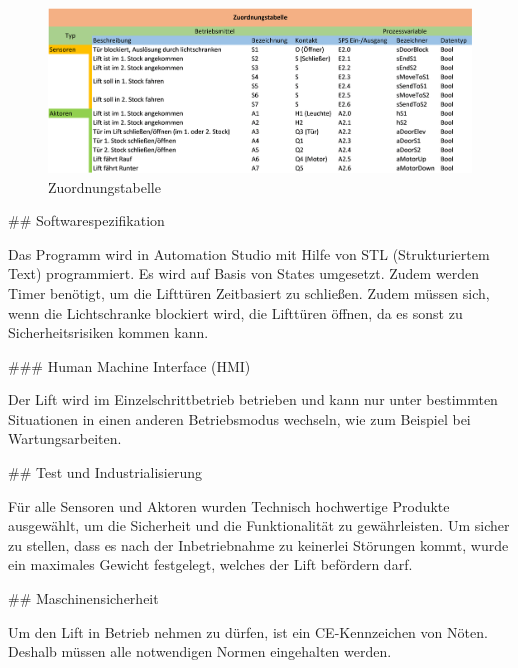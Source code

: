 \begin{markdown}
\begin{figure}[H]
    \centering
    \includegraphics[width=\textwidth]{./images/Zuordnungstabelle.png}
    \caption[Zuordnungstabelle]{Zuordnungstabelle}
\end{figure}

## Softwarespezifikation

Das Programm wird in Automation Studio mit Hilfe von STL (Strukturiertem Text) programmiert. Es wird auf Basis von States umgesetzt. Zudem werden Timer benötigt, um die Lifttüren Zeitbasiert zu schließen. Zudem müssen sich, wenn die Lichtschranke blockiert wird, die Lifttüren öffnen, da es sonst zu Sicherheitsrisiken kommen kann. 

### Human Machine Interface (HMI)

Der Lift wird im Einzelschrittbetrieb betrieben und kann nur unter bestimmten Situationen in einen anderen Betriebsmodus wechseln, wie zum Beispiel bei Wartungsarbeiten.

## Test und Industrialisierung

Für alle Sensoren und Aktoren wurden Technisch hochwertige Produkte ausgewählt, um die Sicherheit und die Funktionalität zu gewährleisten. Um sicher zu stellen, dass es nach der Inbetriebnahme zu keinerlei Störungen kommt, wurde ein maximales Gewicht festgelegt, welches der Lift befördern darf.

## Maschinensicherheit

Um den Lift in Betrieb nehmen zu dürfen, ist ein CE-Kennzeichen von Nöten. Deshalb müssen alle notwendigen Normen eingehalten werden.
\end{markdown}
